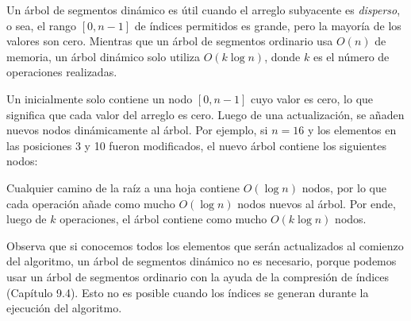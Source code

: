 
Un árbol de segmentos dinámico es útil cuando el arreglo subyacente es
\emph{disperso}, o sea, el rango $[0,n-1]$ de índices permitidos es grande,
pero la mayoría de los valores son cero. Mientras que un árbol de segmentos
ordinario usa $O(n)$ de memoria, un árbol dinámico solo utiliza $O(k \log n)$,
donde $k$ es el número de operaciones realizadas.

Un  inicialmente solo contiene un nodo
$[0,n-1]$ cuyo valor es cero, lo que significa que cada valor del arreglo es
cero. Luego de una actualización, se añaden nuevos nodos dinámicamente al
árbol. Por ejemplo, si $n=16$ y los elementos en las posiciones 3 y 10 fueron
modificados, el nuevo árbol contiene los siguientes nodos:
\begin{center}
\end{center}

Cualquier camino de la raíz a una hoja contiene $O(\log n)$ nodos, por lo que
cada operación añade como mucho $O(\log n)$ nodos nuevos al árbol. Por ende,
luego de $k$ operaciones, el árbol contiene como mucho $O(k \log n)$ nodos.

Observa que si conocemos todos los elementos que serán actualizados al
comienzo del algoritmo, un árbol de segmentos dinámico no es necesario,
porque podemos usar un árbol de segmentos ordinario con la ayuda de la
compresión de índices (Capítulo 9.4). Esto no es posible cuando los índices
se generan durante la ejecución del algoritmo.


